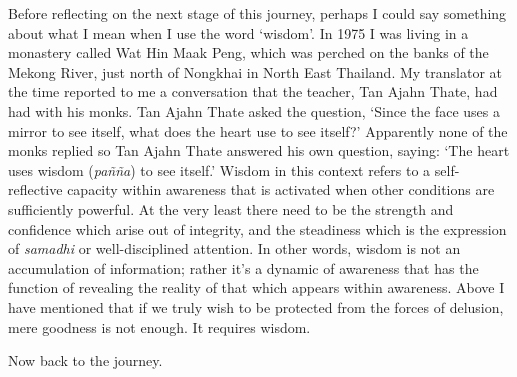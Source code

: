 Before reflecting on the next stage of this journey, perhaps I could say
something about what I mean when I use the word `wisdom'. In 1975 I was
living in a monastery called Wat Hin Maak Peng, which was perched on the
banks of the Mekong River, just north of Nongkhai in North East
Thailand. My translator at the time reported to me a conversation that
the teacher, Tan Ajahn Thate, had had with his monks. Tan Ajahn Thate
asked the question, `Since the face uses a mirror to see itself, what
does the heart use to see itself?' Apparently none of the monks replied
so Tan Ajahn Thate answered his own question, saying: `The heart uses
wisdom (\emph{pañña}) to see itself.' Wisdom in this context refers to a
self-reflective capacity within awareness that is activated when other
conditions are sufficiently powerful. At the very least there need to be
the strength and confidence which arise out of integrity, and the
steadiness which is the expression of \emph{samadhi} or well-disciplined
attention. In other words, wisdom is not an accumulation of information;
rather it's a dynamic of awareness that has the function of revealing
the reality of that which appears within awareness. Above I have
mentioned that if we truly wish to be protected from the forces of
delusion, mere goodness is not enough. It requires wisdom.

Now back to the journey.

